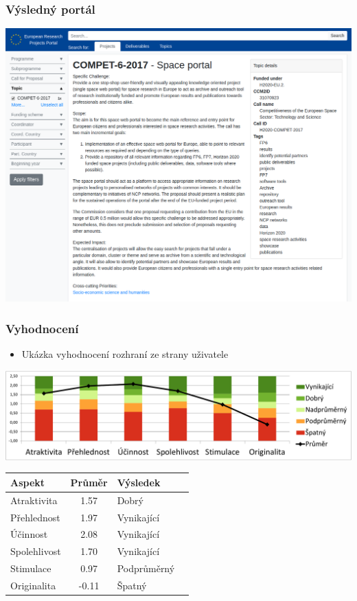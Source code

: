 \documentclass[10pt,xcolor=pdflatex]{beamer}
\begin{document}
\begin{frame}
    \frametitle{Výsledný portál}
    \begin{center}
        \includegraphics[scale=0.25]{img/my-topic.png}
    \end{center}
\end{frame}

\begin{frame}
    \frametitle{Vyhodnocení}
     \begin{itemize}
        \item Ukázka vyhodnocení rozhraní ze strany uživatele
    \end{itemize}
    \begin{center}
        \includegraphics[width=\textwidth]{img/ueq-benchmark.pdf}
    \end{center}
    \begin{table}[H]
        \centering
        \begin{tabular}{ |l|c|l|l| } 
        \hline
        Aspekt       & Průměr & Výsledek    \\
        \hline
        Atraktivita  & 1.57   & Dobrý       \\
        Přehlednost  & 1.97   & Vynikající  \\
        Účinnost     & 2.08   & Vynikající  \\
        Spolehlivost & 1.70   & Vynikající  \\
        Stimulace    & 0.97   & Podprůměrný \\
        Originalita  & -0.11  & Špatný      \\  
        \hline
        \end{tabular}
    \end{table}
\end{frame}
\end{document}
